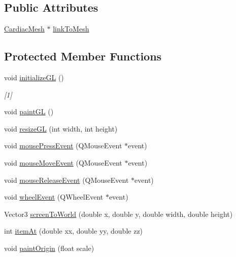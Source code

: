 \subsection*{Public Attributes}
\begin{DoxyCompactItemize}
\item 
\hyperlink{class_cardiac_mesh}{Cardiac\+Mesh} $\ast$ \hyperlink{classgl_atrium_a8ded24946b8c91b4e1fb7f4f0545a6b0}{link\+To\+Mesh}
\end{DoxyCompactItemize}
\subsection*{Protected Member Functions}
\begin{DoxyCompactItemize}
\item 
void \hyperlink{classgl_atrium_a6fc7ea9064a492b562c0858eb3c44f86}{initialize\+G\+L} ()
\begin{DoxyCompactList}\small\item\em \mbox{[}1\mbox{]} \end{DoxyCompactList}\item 
void \hyperlink{classgl_atrium_a951d4caaef073f6762ddd47a409d2cf6}{paint\+G\+L} ()
\item 
void \hyperlink{classgl_atrium_a40cd7c018c743e5738560fdb4e4fea59}{resize\+G\+L} (int width, int height)
\item 
void \hyperlink{classgl_atrium_af0e47f4d5e0bc6d8cdcf16dd23c0487b}{mouse\+Press\+Event} (Q\+Mouse\+Event $\ast$event)
\item 
void \hyperlink{classgl_atrium_ad5af63d41d959d40d475d8e1aa0f6e9e}{mouse\+Move\+Event} (Q\+Mouse\+Event $\ast$event)
\item 
void \hyperlink{classgl_atrium_a3b2fff6d451823faa28b1b5f09aa384d}{mouse\+Release\+Event} (Q\+Mouse\+Event $\ast$event)
\item 
void \hyperlink{classgl_atrium_a5a4eb4614e6619d55a484cdfb733b2ea}{wheel\+Event} (Q\+Wheel\+Event $\ast$event)
\item 
Vector3 \hyperlink{classgl_atrium_a939d7c7a5289deeeea1763544e5be6b5}{screen\+To\+World} (double x, double y, double width, double height)
\item 
int \hyperlink{classgl_atrium_a02590feb7cd82c82cc67d0697136baf4}{item\+At} (double xx, double yy, double zz)
\item 
void \hyperlink{classgl_atrium_aff81827e3285b74bea0e3777a75393db}{paint\+Origin} (float scale)
\end{DoxyCompactItemize}
